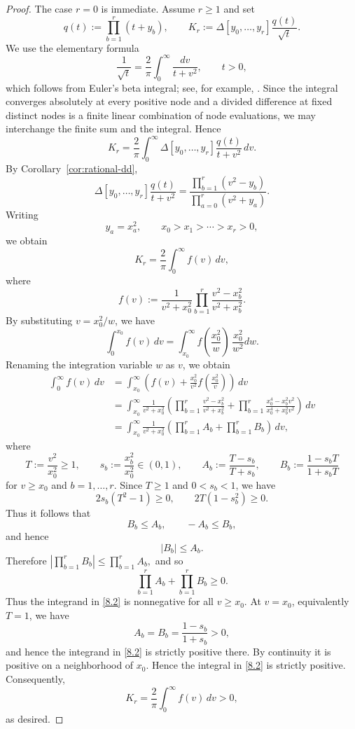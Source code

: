 \documentclass[10pt,a4paper]{amsart}
\theoremstyle{definition}
\newcommand{\DD}{\Delta}
\begin{document}
\begin{proof}
The case $r=0$ is immediate. Assume $r\ge1$ and set
\[
q(t):=\prod_{b=1}^r(t+y_b),
\qquad
K_r:=
\DD[y_0,\ldots,y_r]
\frac{q(t)}{\sqrt t}.
\]
We use the elementary formula
\[
\frac1{\sqrt t}
=
\frac2\pi
\int_0^\infty
\frac{dv}{t+v^2},
\qquad t>0,
\]
which follows from Euler's beta integral;
see, for example, \cite[Chapter~1]{AndrewsAskeyRoy}.
Since the integral converges absolutely at every positive node and a
divided difference at fixed distinct nodes is a finite linear combination
of node evaluations, we may interchange the finite sum and the integral.
Hence
\[
K_r
=
\frac2\pi
\int_0^\infty
\DD[y_0,\ldots,y_r]
\frac{q(t)}{t+v^2}
\,dv.
\]
By Corollary~\ref{cor:rational-dd},
\[
\DD[y_0,\ldots,y_r]
\frac{q(t)}{t+v^2}
=
\frac{\prod_{b=1}^r(v^2-y_b)}{\prod_{a=0}^r(v^2+y_a)}.
\]
Writing
\[
y_a=x_a^2,
\qquad
x_0>x_1>\cdots>x_r>0,
\]
we obtain
\[
K_r
=
\frac2\pi
\int_0^\infty
f(v)\,dv,
\]
where
\[
f(v)
:=
\frac1{v^2+x_0^2}
\prod_{b=1}^r
\frac{v^2-x_b^2}
     {v^2+x_b^2}.
\]
By substituting $v= x_0^2 / w$,
we have
\[
\int_0^{x_0}
f(v)\,dv
=
\int_{x_0}^{\infty}
f\!\left(\frac{x_0^2}{w}\right)
     \, \frac{x_0^2}{w^2} dw.
\]
Renaming the integration variable \(w\) as \(v\), we obtain
\begin{equation}\label{8.2}
\begin{aligned}
\int_0^\infty f(v)\,dv
&=
\int_{x_0}^\infty
\left(
f(v)
+
\frac{x_0^2}{v^2}
f\!\left(\frac{x_0^2}{v}\right)
\right)\,dv\\
&=
\int_{x_0}^\infty
\frac1{v^2+x_0^2}
\left(
\prod_{b=1}^r
\frac{v^2-x_b^2}
     {v^2+x_b^2}
+
\prod_{b=1}^r
\frac{x_0^4-x_b^2v^2}
     {x_0^4+x_b^2v^2}
\right)\,dv\\
&=
\int_{x_0}^\infty
\frac1{v^2+x_0^2}
\left(
\prod_{b=1}^r A_b
+
\prod_{b=1}^r B_b
\right)\,dv,
\end{aligned}
\end{equation}
where
\[
T:=\frac{v^2}{x_0^2}\ge1,
\qquad
s_b:=\frac{x_b^2}{x_0^2}\in(0,1),
\qquad
A_b:=\frac{T-s_b}{T+s_b},
\qquad
B_b:=\frac{1-s_bT}{1+s_bT}
\]
for $v\ge x_0$ and $b = 1,\dots,r$.
Since \(T\ge1\) and \(0<s_b<1\), we have
\[
2s_b(T^2-1)\ge0, \qquad
2T(1-s_b^2)\ge0.
\]
Thus it follows that
\[
B_b\le A_b,
\qquad
-A_b\le B_b,
\]
and hence
\[
|B_b|\le A_b.
\]
Therefore
\(
\left|
\prod_{b=1}^r B_b
\right|
\le
\prod_{b=1}^r A_b,
\)
and so
\[
\prod_{b=1}^r A_b
+
\prod_{b=1}^r B_b
\ge0.
\]
Thus the integrand in \eqref{8.2} is nonnegative for all $v\ge x_0$.
At $v=x_0$, equivalently $T=1$, we have
\[
A_b=B_b=\frac{1-s_b}{1+s_b}>0,
\]
and hence the integrand in \eqref{8.2} is strictly positive there. By continuity it is positive
on a neighborhood of $x_0$. Hence the integral in \eqref{8.2} is
strictly positive.
Consequently,
\[
K_r
=
\frac2\pi
\int_0^\infty f(v)\,dv
>0,
\]
as desired.
\end{proof}
\end{document}

